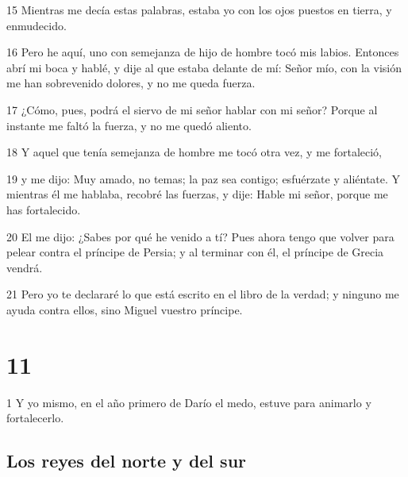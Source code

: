 \par 15 Mientras me decía estas palabras, estaba yo con los ojos puestos en tierra, y enmudecido.
\par 16 Pero he aquí, uno con semejanza de hijo de hombre tocó mis labios. Entonces abrí mi boca y hablé, y dije al que estaba delante de mí: Señor mío, con la visión me han sobrevenido dolores, y no me queda fuerza.
\par 17 ¿Cómo, pues, podrá el siervo de mi señor hablar con mi señor? Porque al instante me faltó la fuerza, y no me quedó aliento.
\par 18 Y aquel que tenía semejanza de hombre me tocó otra vez, y me fortaleció,
\par 19 y me dijo: Muy amado, no temas; la paz sea contigo; esfuérzate y aliéntate. Y mientras él me hablaba, recobré las fuerzas, y dije: Hable mi señor, porque me has fortalecido.
\par 20 El me dijo: ¿Sabes por qué he venido a tí? Pues ahora tengo que volver para pelear contra el príncipe de Persia; y al terminar con él, el príncipe de Grecia vendrá.
\par 21 Pero yo te declararé lo que está escrito en el libro de la verdad; y ninguno me ayuda contra ellos, sino Miguel vuestro príncipe.

\chapter{11}

\par 1 Y yo mismo, en el año primero de Darío el medo, estuve para animarlo y fortalecerlo.

\section*{Los reyes del norte y del sur}

